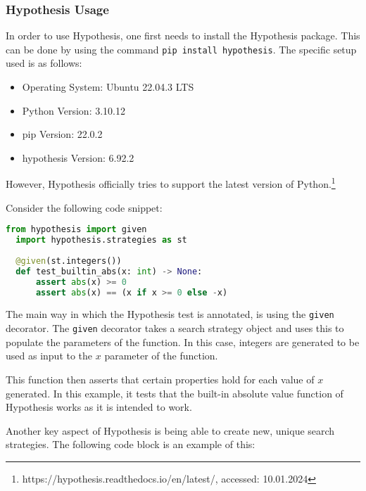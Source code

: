 \documentclass[runningheads]{llncs}
\begin{document}
\subsubsection{Hypothesis Usage}
In order to use Hypothesis, one first needs to install the Hypothesis package. This can be done by using the command \texttt{pip install hypothesis}. The specific setup used is as follows:

\begin{itemize}
  \item Operating System: Ubuntu 22.04.3 LTS
  \item Python Version: 3.10.12
  \item pip Version: 22.0.2
  \item hypothesis Version: 6.92.2
\end{itemize}
However, Hypothesis officially tries to support the latest version of Python.\footnote{https://hypothesis.readthedocs.io/en/latest/, accessed: 10.01.2024}

\vspace{5mm}
\noindent Consider the following code snippet:
\begin{lstlisting}[language=Python]
  from hypothesis import given
  import hypothesis.strategies as st
  
  @given(st.integers())
  def test_builtin_abs(x: int) -> None:
      assert abs(x) >= 0
      assert abs(x) == (x if x >= 0 else -x)
\end{lstlisting}
The main way in which the Hypothesis test is annotated, is using the \texttt{given} decorator. The \texttt{given} decorator takes a search strategy object and uses this to populate the parameters of the function. In this case, integers are generated to be used as input to the $x$ parameter of the function.

This function then asserts that certain properties hold for each value of $x$ generated. In this example, it tests that the built-in absolute value function of Hypothesis works as it is intended to work.

\vspace{5mm}
\noindent Another key aspect of Hypothesis is being able to create new, unique search strategies. The following code block is an example of this:
\end{document}
